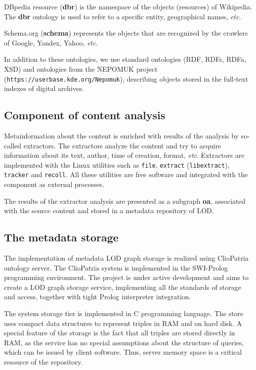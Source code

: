 \documentclass[conference,a4paper]{IEEEtran}
\providecommand\url[1]{\texttt{#1}}
\begin{document}
DBpedia resource (\textbf{dbr}) is the namespace of the objects (resources) of Wikipedia.  The \textbf{dbr} ontology is used to refer to a specific entity, geographical names, \emph{etc}.

Schema.org (\textbf{schema}) represents the objects that are recognized by the crawlers of Google, Yandex, Yahoo, \emph{etc}.

In addition to these ontologies, we use standard ontologies (RDF, RDFs, RDFa, XSD) and ontologies from the NEPOMUK project (\url{https://userbase.kde.org/Nepomuk}), describing objects stored in the full-text indexes of digital archives.

\subsection{Component of content analysis}

Metainformation about the content is enriched with results of the analysis by so-called extractors. The extractors analyze the content and try to acquire information about its text, author, time of creation, format, \emph{etc}. Extractors are implemented with the Linux utilities such as \texttt{file}, \texttt{extract} (\texttt{libextract}), \texttt{tracker} and \texttt{recoll}.  All these utilities are free software and integrated with the component as external processes.

The results of the extractor analysis are presented as a subgraph \textbf{oa}, associated with the source content and stored in a metadata repository of LOD.

\subsection{The metadata storage}

The implementation of metadata LOD graph storage is realized using ClioPatria \cite{b8} ontology server.  The ClioPatria system is implemented in the SWI-Prolog programming environment.  The project is under active development and aims to create a LOD graph storage service, implementing all the standards of storage and access, together with tight Prolog interpreter integration.

The system storage tier is implemented in C programming language.  The store uses compact data structures to represent triples in RAM and on hard disk.  A special feature of the storage is the fact that all triples are stored directly in RAM, as the service has no special assumptions about the structure of queries, which can be issued by client software.  Thus, server memory space is a critical resource of the repository.
\end{document}
